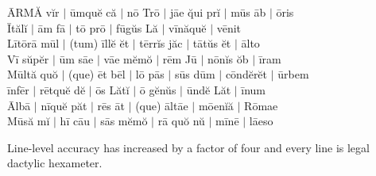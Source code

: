 \documentclass[12pt]{article}
\begin{document}
\begin{center}
\colorbox{highlightwhite}{\={A}RM\u{A} v\u{i}r $\vert$ \={u}mqu\u{e} c\u{a} $\vert$ n\={o} Tr\={o} $\vert$ j\={ae} \u{qui} pr\u{i} $\vert$ m\={u}s \={a}b $\vert$ \={o}ris}\\ 
\colorbox{highlightwhite}{\={I}t\u{a}l\u{i} $\vert$ \={a}m f\={a} $\vert$ t\={o} pr\={o} $\vert$ f\={u}g\u{u}s L\u{a} $\vert$ v\={i}n\u{a}qu\u{e} $\vert$ v\={e}nit}\\ 
\colorbox{highlightwhite}{L\={i}t\={o}r\={a} m\={u}l $\vert$ (tum) \={i}ll\u{e} \u{e}t $\vert$ t\={e}rr\u{i}s j\u{a}c $\vert$ t\={a}t\u{u}s \u{e}t $\vert$ \={a}lto}\\ 
\colorbox{highlightwhite}{V\={i} s\u{u}p\u{e}r $\vert$ \={u}m s\={ae} $\vert$ v\={ae} m\u{e}m\u{o} $\vert$ r\={e}m J\={u} $\vert$ n\={o}n\u{i}s \u{o}b $\vert$ \={i}ram}\\ 
\colorbox{highlightgreen}{M\={u}lt\u{a} qu\u{o} $\vert$ (que) \={e}t b\={e}l $\vert$ l\={o} p\={a}s $\vert$ s\={u}s d\={u}m $\vert$ c\={o}nd\u{e}r\u{e}t $\vert$ \={u}rbem}\\ 
\colorbox{highlightgreen}{\={i}nf\={e}r $\vert$ r\={e}tqu\u{e} d\u{e} $\vert$ \={o}s L\u{a}t\u{i} $\vert$ \={o} g\u{e}n\u{u}s $\vert$ \={u}nd\u{e} L\u{a}t $\vert$ \={i}num}\\ 
\colorbox{highlightgreen}{\={A}lb\={a} $\vert$ n\={i}qu\u{e} p\u{a}t $\vert$ r\={e}s \={a}t $\vert$ (que) \={a}lt\={ae} $\vert$ m\={oe}n\u{i}\u{a} $\vert$ R\={o}mae}\\ 
\colorbox{highlightgreen}{M\={u}s\u{a} m\u{i} $\vert$ h\={i} c\={au} $\vert$ s\={a}s m\u{e}m\u{o} $\vert$ r\={a} qu\u{o} n\u{u} $\vert$ m\={i}n\={e} $\vert$ l\={ae}so}\\
\end{center}
Line-level accuracy has increased by a factor of four and every line is legal dactylic hexameter. 
\end{document}
